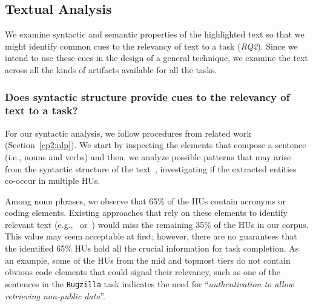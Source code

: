
\subsection{Textual Analysis}


We examine syntactic and semantic properties 
of the highlighted text so that 
we might identify
common cues to the relevancy of text to a task (\textit{RQ2}).
Since we intend to use these cues 
in the design of a general technique, 
we examine the text across 
all the kinds of artifacts 
available for all the tasks. 




 





\subsubsection{Does syntactic structure provide cues to the relevancy of text to a task?}
\label{cp3:syntactic-analysis}


For our syntactic analysis, we follow procedures from related work (Section~\ref{cp2:nlp}).
We start by inspecting the elements that compose a sentence (i.e., nouns and verbs)
and then, we analyze possible patterns that may arise from the syntactic structure of the text~\cite{Robillard2015},
investigating if the extracted entities co-occur in multiple HUs.






Among noun phrases, we observe that 65\% of the HUs contain acronyms or coding elements.
Existing approaches that rely on these elements to identify relevant text (e.g.,~\cite{Robillard2015} or~\cite{Jiang2016b}) would miss the remaining 35\% of the HUs in our corpus.
This value may seem acceptable at first; however, there are no guarantees that
the identified 65\% HUs hold all the crucial information for task completion.
As an example, some of the HUs from the mid and topmost tiers 
do not contain obvious code elements that could signal their relevancy,
such as one of the sentences in the \texttt{Bugzilla} task indicates the need for ``\textit{authentication to allow retrieving non-public data}''.






